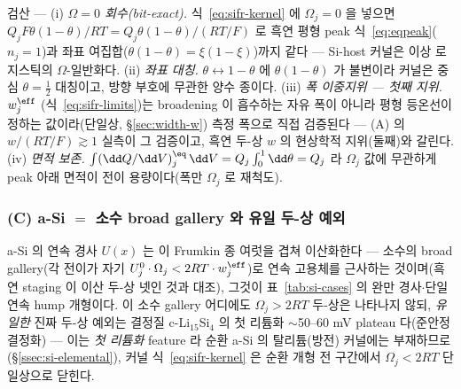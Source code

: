\begin{verifybox}
검산 --- (i) \emph{$\Omega{=}0$ 회수(bit-exact).} 식~\eqref{eq:sifr-kernel} 에 $\Omega_j{=}0$ 을 넣으면
$Q_jF\theta(1-\theta)/RT=Q_j\theta(1-\theta)/(RT/F)$ 로 흑연 평형 peak 식~\eqref{eq:eqpeak}($n_j{=}1$)과
좌표 여집합($\theta(1-\theta)=\xi(1-\xi)$)까지 같다 --- Si-host 커널은 이상 로지스틱의 $\Omega$-일반화다.
(ii) \emph{좌표 대칭.} $\theta\leftrightarrow1-\theta$ 에 $\theta(1-\theta)$ 가 불변이라 커널은 중심 $\theta{=}\tfrac12$
대칭이고, 방향 부호에 무관한 양수 종이다. (iii) \emph{폭 이중지위 --- 첫째 지위.} $w_j^{\eff}$
(식~\eqref{eq:sifr-limits})는 broadening 이 흡수하는 자유 폭이 아니라 평형 등온선이 정하는 값이라(단일상,
\S\ref{sec:width-w}) 측정 폭으로 직접 검증된다 --- (A) 의 $w/(RT/F)\gtrsim1$ 실측이 그 검증이고, 흑연 두-상
$w$ 의 현상학적 지위(둘째)와 갈린다. (iv) \emph{면적 보존.} $\int(\dd Q/\dd V)^\eq_j\,\dd V=Q_j\int_0^1\dd\theta=Q_j$
라 $\Omega_j$ 값에 무관하게 peak 아래 면적이 전이 용량이다(폭만 $\Omega_j$ 로 재척도).
\end{verifybox}

\subsubsection*{(C) a-Si $=$ 소수 broad gallery 와 유일 두-상 예외}
a-Si 의 연속 경사 $U(x)$ 는 이 Frumkin 종 여럿을 겹쳐 이산화한다 --- 소수의 broad gallery(각 전이가 자기
$U_j^0\cdot\Omega_j<2RT\cdot w_j^{\eff}$)로 연속 고용체를 근사하는 것이며(흑연 staging 이 이산 두-상 넷인 것과
대조), 그것이 표~\ref{tab:si-cases} 의 완만 경사$\cdot$단일 연속 hump 개형이다. 이 소수 gallery 어디에도
$\Omega_j>2RT$ 두-상은 나타나지 않되, \emph{유일한} 진짜 두-상 예외는 결정질 c-Li$_{15}$Si$_4$ 의 첫 리튬화
$\sim$50--60 mV plateau 다(준안정 결정화\cite{obrovac_christensen2004}) --- 이는 \emph{첫 리튬화} feature 라
순환 a-Si 의 탈리튬(방전) 커널에는 부재하므로(\S\ref{ssec:si-elemental}), 커널 식~\eqref{eq:sifr-kernel} 은
순환 개형 전 구간에서 $\Omega_j<2RT$ 단일상으로 닫힌다.

